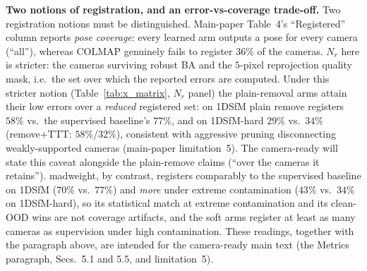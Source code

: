 \documentclass[10pt,twocolumn,letterpaper]{article}
\begin{document}
\noindent\textbf{Two notions of registration, and an error-vs-coverage trade-off.} Two
registration notions must be distinguished. Main-paper Table~4's ``Registered'' column
reports \emph{pose coverage}: every learned arm outputs a pose for every camera
(``all''), whereas COLMAP genuinely fails to register $36\%$ of the cameras. $N_r$ here
is stricter: the cameras surviving robust BA and the $5$-pixel reprojection quality mask,
i.e.\ the set over which the reported errors are computed. Under this stricter notion (Table~\ref{tab:x_matrix}, $N_r$ panel) the
plain-removal arms attain their low errors over a \emph{reduced} registered set: on
1DSfM plain remove registers $58\%$ vs.\ the supervised baseline's $77\%$, and on
1DSfM-hard $29\%$ vs.\ $34\%$ (remove+TTT: $58\%$/$32\%$), consistent with
aggressive pruning disconnecting weakly-supported cameras (main-paper limitation~5). The
camera-ready will state this caveat alongside the plain-remove claims (``over the cameras
it retains''). madweight, by contrast, registers comparably to the supervised baseline on 1DSfM
($70\%$ vs.\ $77\%$) and \emph{more} under extreme contamination ($43\%$ vs.\
$34\%$ on 1DSfM-hard), so its statistical match at extreme contamination and its
clean-OOD wins are not coverage artifacts, and the soft arms
register at least as many cameras as supervision under high contamination. These
readings, together with the paragraph above, are intended for the camera-ready main text
(the Metrics paragraph, Secs.~5.1 and 5.5, and limitation~5).
\end{document}

